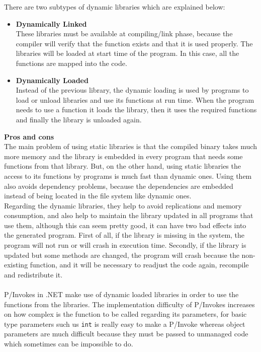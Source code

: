 \begin{itemize}
There are two subtypes of dynamic libraries which are explained below:
  \begin{itemize}
    \item 
    \textbf{Dynamically Linked}
  	\\
  	These libraries must be available at compiling/link phase, because the compiler will verify that the function exists and that it is used properly. The libraries will be loaded at start time of the program. In this case, all the functions are mapped into the code.
    \item
    \textbf{Dynamically Loaded}
    \\
    Instead of the previous library, the dynamic loading is used by programs to load or unload libraries and use its functions at run time. When the program needs to use a function it loads the library, then it uses the required functions and finally the library is unloaded again.
    \end{itemize}
\end{itemize}

\textbf{Pros and cons}
\\
The main problem of using static libraries is that the compiled binary takes much more memory and the library is embedded in every program that needs some functions from that library. But, on the other hand, using static libraries the access to its functions by programs is much fast than dynamic ones. Using them also avoids dependency problems, because the dependencies are embedded instead of being located in the file system like dynamic ones.
\\
Regarding the dynamic libraries, they help to avoid replications and memory consumption, and also help to maintain the library updated in all programs that use them, although this can seem pretty good, it can have two bad effects into the generated program. First of all, if the library is missing in the system, the program will not run or will crash in execution time. Secondly, if the library is updated but some methods are changed, the program will crash because the non-existing function, and it will be necessary to readjust the code again, recompile and redistribute it.
\\
\\
P/Invokes in .NET make use of dynamic loaded libraries in order to use the functions from the libraries. The implementation difficulty of P/Invokes increases on how complex is the function to be called regarding its parameters, for basic type parameters such us \verb!int! is really easy to make a P/Invoke whereas object parameters are much difficult because they must be passed to unmanaged code which sometimes can be impossible to do.


